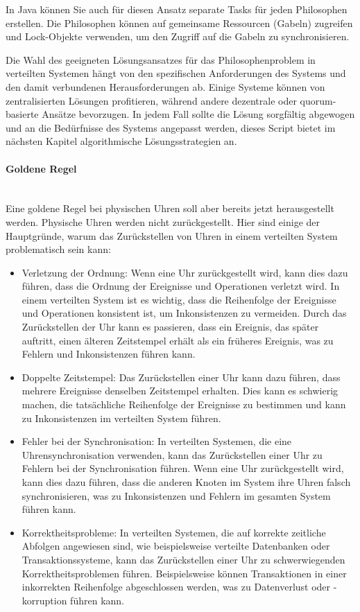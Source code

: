 In Java können Sie auch für diesen Ansatz separate Tasks für jeden Philosophen erstellen. Die Philosophen können auf gemeinsame Ressourcen (Gabeln) zugreifen und Lock-Objekte verwenden, um den Zugriff auf die Gabeln zu synchronisieren.

Die Wahl des geeigneten Lösungsansatzes für das Philosophenproblem in verteilten Systemen hängt von den spezifischen Anforderungen des Systems und den damit verbundenen Herausforderungen ab. Einige Systeme können von zentralisierten Lösungen profitieren, während andere dezentrale oder quorum-basierte Ansätze bevorzugen. In jedem Fall sollte die Lösung sorgfältig abgewogen und an die Bedürfnisse des Systems angepasst werden, dieses Script bietet im nächsten Kapitel algorithmische Lösungsstrategien an.

\paragraph{Goldene Regel\\\\}
Eine goldene Regel bei physischen Uhren soll aber bereits jetzt herausgestellt werden. Physische Uhren werden nicht zurückgestellt. Hier sind einige der Hauptgründe, warum das Zurückstellen von Uhren in einem verteilten System problematisch sein kann:
\begin{itemize}
\item Verletzung der Ordnung: Wenn eine Uhr zurückgestellt wird, kann dies dazu führen, dass die Ordnung der Ereignisse und Operationen verletzt wird. In einem verteilten System ist es wichtig, dass die Reihenfolge der Ereignisse und Operationen konsistent ist, um Inkonsistenzen zu vermeiden. Durch das Zurückstellen der Uhr kann es passieren, dass ein Ereignis, das später auftritt, einen älteren Zeitstempel erhält als ein früheres Ereignis, was zu Fehlern und Inkonsistenzen führen kann.
\item Doppelte Zeitstempel: Das Zurückstellen einer Uhr kann dazu führen, dass mehrere Ereignisse denselben Zeitstempel erhalten. Dies kann es schwierig machen, die tatsächliche Reihenfolge der Ereignisse zu bestimmen und kann zu Inkonsistenzen im verteilten System führen.
\item Fehler bei der Synchronisation: In verteilten Systemen, die eine Uhrensynchronisation verwenden, kann das Zurückstellen einer Uhr zu Fehlern bei der Synchronisation führen. Wenn eine Uhr zurückgestellt wird, kann dies dazu führen, dass die anderen Knoten im System ihre Uhren falsch synchronisieren, was zu Inkonsistenzen und Fehlern im gesamten System führen kann.
\item Korrektheitsprobleme: In verteilten Systemen, die auf korrekte zeitliche Abfolgen angewiesen sind, wie beispielsweise verteilte Datenbanken oder Transaktionssysteme, kann das Zurückstellen einer Uhr zu schwerwiegenden Korrektheitsproblemen führen. Beispielsweise können Transaktionen in einer inkorrekten Reihenfolge abgeschlossen werden, was zu Datenverlust oder -korruption führen kann.
\end{itemize}
